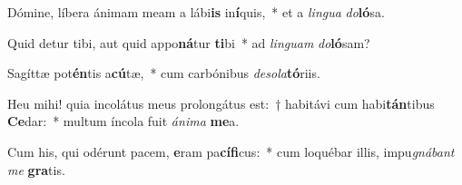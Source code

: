 \item Dómine, líbera ánimam meam a lábi\textbf{is} in\textbf{í}quis,~* et a \textit{lin}\textit{gua} \textit{do}\textbf{ló}sa.
\item Quid detur tibi, aut quid appo\textbf{ná}tur \textbf{ti}bi~* ad \textit{lin}\textit{guam} \textit{do}\textbf{ló}sam?
\item Sagíttæ pot\textbf{én}tis a\textbf{cú}tæ,~* cum carbónibus \textit{de}\textit{so}\textit{la}\textbf{tó}riis.
\item Heu mihi! quia incolátus meus prolongátus est:~† habitávi cum habi\textbf{tán}tibus \textbf{Ce}dar:~* multum íncola fuit \textit{á}\textit{ni}\textit{ma} \textbf{me}a.
\item Cum his, qui odérunt pacem, \textbf{e}ram pa\textbf{cí}\textbf{fi}cus:~* cum loquébar illis, impu\textit{gná}\textit{bant} \textit{me} \textbf{gra}tis.
